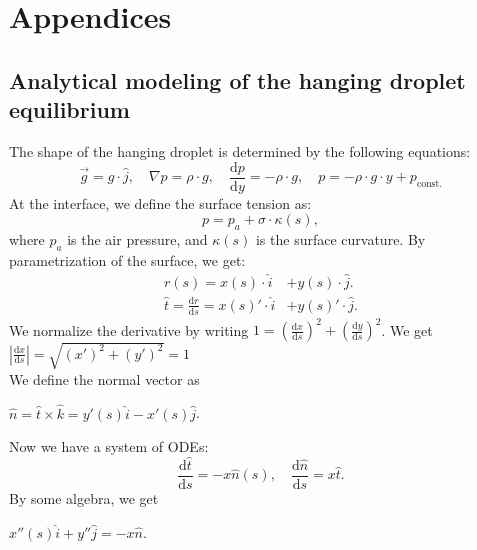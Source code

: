 \documentclass{jfm}
\begin{document}
\section{Appendices} 
\subsection{Analytical modeling of the hanging droplet equilibrium} \label{app:equi}
    The shape of the hanging droplet is determined by the following equations:\\
    \begin{equation}
        \vec{g}=g\cdot\hat{j}, \quad
        \nabla{p}=\rho\cdot{g}, \quad
        \frac{\mathrm{d}p}{\mathrm{d}y}=-\rho\cdot{g}, \quad
        p=-\rho\cdot{g}\cdot{y}+p_{\text{const.}}
    \end{equation}
    At the interface, we define the surface tension as:\\
    \begin{equation}
        p=p_{a}+\sigma \cdot \kappa(s),
        \label{eq:pressure}
    \end{equation}
    where $p_{a}$ is the air pressure, and $\kappa(s)$ is the surface curvature. By parametrization of the surface, we get:\\
    \begin{align}
        r(s)=x(s)\cdot\hat{i}&+y(s)\cdot\hat{j}.\\
        \hat{t}=\frac{\mathrm{d}r}{\mathrm{d}s}=x(s)'\cdot\hat{i}&+y(s)'\cdot\hat{j}.
    \end{align}
    We normalize the derivative by writing $1=\left(\frac{\mathrm{d}x}{\mathrm{d}s}\right)^2+\left(\frac{\mathrm{d}y}{\mathrm{d}s}\right)^2$. We get $\left|\frac{\mathrm{d}x}{\mathrm{d}s}\right|=\sqrt{(x')^2+(y')^2}=1$\\
    We define the normal vector as\\
    \begin{center}
        $\hat{n}=\hat{t}\times\hat{k}=y'(s)\hat{i}-x'(s)\hat{j}$.
    \end{center}
    Now we have a system of ODEs:\\
    \begin{equation}
        \frac{\mathrm{d}\hat{t}}{\mathrm{d}s}=-x\hat{n}(s), \quad
        \frac{\mathrm{d}\hat{n}}{\mathrm{d}s}=x\hat{t}.
    \end{equation}
    By some algebra, we get\\
    \begin{center}
        $x''(s)\hat{i}+y''\hat{j}=-x\hat{n}$.
    \end{center}
\end{document}
